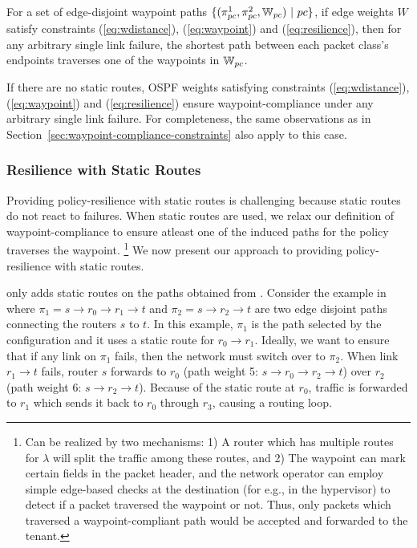 \iffull
\begin{theorem}
	For a set of edge-disjoint waypoint paths $\{(\pi^1_{pc}, \pi^2_{pc}, \mathbb{W}_{pc}) ~|~ pc\}$, 
	if edge weights $W$ satisfy constraints (\ref{eq:wdistance}), (\ref{eq:waypoint}) and
	(\ref{eq:resilience}), 
	then for any arbitrary single link failure, 
	the shortest path between each packet class's 
	endpoints traverses one of the waypoints in $\mathbb{W}_{pc}$.
\end{theorem}

\fi

If there are no static routes, OSPF weights satisfying constraints 
(\ref{eq:wdistance}), (\ref{eq:waypoint}) and (\ref{eq:resilience}) ensure
waypoint-compliance under any arbitrary single link failure. For completeness, 
the same observations as in Section~\ref{sec:waypoint-compliance-constraints}
also apply to this case.  


\subsubsection{Resilience with Static Routes} \hspace*{4mm}
Providing policy-resilience with static routes is challenging
because static routes do not react to failures. When static routes
are used, we relax our definition of waypoint-compliance to 
ensure atleast one of the induced paths for the policy traverses the waypoint.
\footnote{
Can be realized by two mechanisms: 1) A router
which has multiple routes for $\lambda$ will split the traffic
among these routes, and 2) The waypoint can mark certain fields in
the packet header, and the network operator can employ 
simple edge-based checks at the destination 
(for e.g., in the hypervisor) to 
detect if a packet traversed the waypoint or not. Thus, only
packets which traversed a waypoint-compliant path would be 
accepted and forwarded to the tenant. 
} We now present our approach to providing policy-resilience with
static routes. 

\name only adds static routes on the paths obtained from \genesis.
Consider the example in  where 
$\pi_1=s\rightarrow r_0 \rightarrow r_1 \rightarrow t$ 
and $\pi_2=s\rightarrow r_2 \rightarrow t$ 
are two edge disjoint paths 
connecting the routers $s$ to $t$. In this example, 
$\pi_1$ is the path selected by the configuration and it uses a static route
for $r_0 \rightarrow r_1$. 
Ideally, we want to ensure 
that if any link on $\pi_1$ fails, 
then the network must switch over to $\pi_2$. 
When link $r_1 \rightarrow t$ fails,
router $s$ forwards to $r_0$ (path weight 5: $ s \rightarrow r_0 \rightarrow r_2 \rightarrow t$)
over $r_2$ (path weight 6: $s \rightarrow r_2 \rightarrow t$). 
Because of the static route at $r_0$, traffic is forwarded
to $r_1$ which sends it back to $r_0$ through $r_3$, 
causing a routing loop. 

